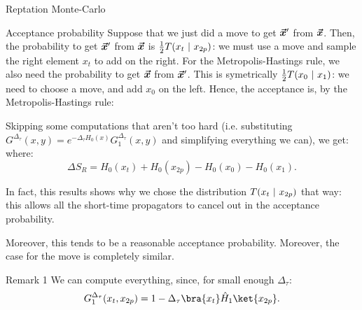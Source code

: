 \documentclass[a4paper]{article}
\begin{document}
\begin{parag}{Reptation Monte-Carlo}
\begin{subparag}{Acceptance probability}
        Suppose that we just did a move  to get $\bm{\protect\vec{x}}'$ from $\bm{\protect\vec{x}}$. Then, the probability to get $\bm{\protect\vec{x}}'$ from $\bm{\protect\vec{x}}$ is $\frac{1}{2} T\left(x_t \suchthat x_{2p}\right)$: we must use a  move and sample the right element $x_t$ to add on the right. For the Metropolis-Hastings rule, we also need the probability to get $\bm{\protect\vec{x}}$ from $\bm{\protect\vec{x}}'$. This is symetrically $\frac{1}{2} T\left(x_0 \suchthat x_1\right)$: we need to choose a  move, and add $x_0$ on the left. Hence, the acceptance is, by the Metropolis-Hastings rule: 
        
        Skipping some computations that aren't too hard (i.e. substituting $G^{\Delta_{\tau}}\left(x, y\right) = e^{- \Delta_{\tau} H_0\left(x\right)} G_1^{\Delta_{\tau}}\left(x, y\right)$ and simplifying everything we can), we get:
        where:
        \[\Delta S_R = H_0\left(x_t\right) + H_0\left(x_{2p}\right) - H_0\left(x_0\right) - H_0\left(x_1\right).\]

        In fact, this results shows why we chose the distribution $T\left(x_t \suchthat x_{2p}\right)$ that way: this allows all the short-time propagators to cancel out in the acceptance probability.

        Moreover, this tends to be a reasonable acceptance probability. Moreover, the case for the move  is completely similar.
    \end{subparag}

    \begin{subparag}{Remark 1}
        We can compute everything, since, for small enough $\Delta_{\tau}$:
        \[G_1^{\Delta_{\tau}}\left(x_t, x_{2p}\right) = 1 - \Delta_{\tau} \bra{x_t} \hat{H}_1 \ket{x_{2p}}.\]
    \end{subparag}


\end{parag}
\end{document}
